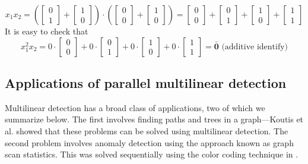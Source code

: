 \begin{mdframed}
{\[
x_1x_2 = 
\left(
\begin{bmatrix}
0\\
1
\end{bmatrix}
+ 
\begin{bmatrix}
1\\
0
\end{bmatrix}
\right)\cdot 
\left(
\begin{bmatrix}
0\\
0
\end{bmatrix}
+
\begin{bmatrix}
1\\
0
\end{bmatrix}
\right) =
\begin{bmatrix}
0\\
0
\end{bmatrix}
+
\begin{bmatrix}
0\\
1
\end{bmatrix}
+
\begin{bmatrix}
1\\
0
\end{bmatrix}
+
\begin{bmatrix}
1\\
1
\end{bmatrix}
\]
It is easy to check that
\[
x_1^2x_2 = 
0\cdot
\begin{bmatrix}
0\\
0
\end{bmatrix}
+ 0\cdot
\begin{bmatrix}
0\\
1
\end{bmatrix}
+ 0\cdot
\begin{bmatrix}
1\\
0
\end{bmatrix}
+ 0\cdot
\begin{bmatrix}
1\\
1
\end{bmatrix}
= \mathbf{\bar{0}} \text{ (additive identify)}
\]
}
\end{mdframed}

\subsection{Applications of parallel multilinear detection}
\label{sec:applications}
Multilinear detection has a broad class of applications\cite{DBLP:journals/talg/KoutisW16,cadena:sdm17}, two of which we summarize below. The first involves finding paths and trees in a graph---Koutis et al.
\cite{DBLP:journals/talg/KoutisW16} showed that these problems can be solved using multilinear detection. The second problem involves anomaly detection using the approach known as graph scan statistics. This was solved sequentially using
the color coding technique in \cite{cadena:sdm17}.

